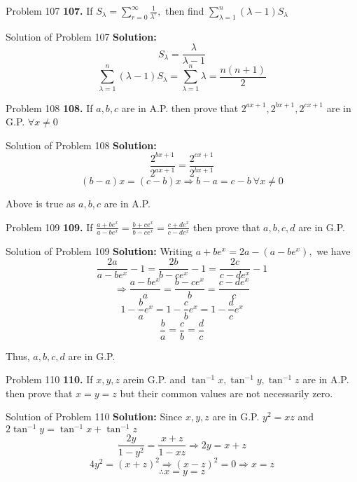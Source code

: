 \documentclass[aspectratio=1610,8pt]{beamer}
\begin{document}
\begin{frame}{Problem 107}
  \textbf{107.} If $S_\lambda = \sum_{r=0}^\infty \frac{1}{\lambda^r},$ then find $\sum_{\lambda = 1}^n(\lambda - 1)S_\lambda$
\end{frame}
\begin{frame}{Solution of Problem 107}
  \textbf{Solution:} $$S_\lambda = \frac{\lambda}{\lambda - 1}$$
  $$\sum_{\lambda = 1}^n(\lambda - 1)S_\lambda = \sum_{\lambda = 1}^n\lambda = \frac{n(n + 1)}{2}$$
\end{frame}
\begin{frame}{Problem 108}
  \textbf{108.} If $a, b, c$ are in A.P. then prove that $2^{ax + 1}, 2^{bx + 1}, 2^{cx + 1}$ are in G.P. $\forall x\neq 0$
\end{frame}
\begin{frame}{Solution of Problem 108}
  \textbf{Solution:} $$\frac{2^{bx + 1}}{2^{ax + 1}} = \frac{2^{cx + 1}}{2^{bx + 1}}$$
  $$(b - a)x = (c - b)x \Rightarrow b -a = c - b~\forall x \neq 0$$

  Above is true as $a, b, c$ are in A.P.
\end{frame}
\begin{frame}{Problem 109}
  \textbf{109.} If $\frac{a + be^x}{a - be^x} = \frac{b + ce^x}{b - ce^x} = \frac{c + de^x}{c - de^x}$ then prove that $a, b, c, d$
  are in G.P.
\end{frame}
\begin{frame}{Solution of Problem 109}
  \textbf{Solution:} Writing $a + be^x = 2a - (a - be^x),$ we have
  $$\frac{2a}{a - be^x} - 1 = \frac{2b}{b - ce^x} - 1 = \frac{2c}{c - de^x} - 1$$
  $$\Rightarrow \frac{a - be^x}{a} = \frac{b - ce^x}{b} = \frac{c - de^x}{c}$$
  $$1 - \frac{b}{a}e^x = 1 - \frac{c}{b}e^x = 1 - \frac{d}{c}e^x$$
  $$\frac{b}{a} = \frac{c}{b} = \frac{d}{c}$$

  Thus, $a, b, c, d$ are in G.P.
\end{frame}
\begin{frame}{Problem 110}
  \textbf{110.} If $x, y, z$ arein G.P. and $\tan^{-1}x, \tan^{-1}y, \tan^{-1}z$ are in A.P. then prove that $x = y = z$ but their
  common values are not necessarily zero.
\end{frame}
\begin{frame}{Solution of Problem 110}
  \textbf{Solution:} Since $x, y, z$ are in G.P. $y^2 = xz$ and $2\tan^{-1}y = \tan^{-1}x + \tan^{-1}z$
  $$\frac{2y}{1 - y^2} = \frac{x + z}{1 - xz}\Rightarrow 2y = x + z$$
  $$4y^2 = (x + z)^2 \Rightarrow (x - z)^2 = 0 \Rightarrow x = z$$
  $$\therefore x = y = z$$
\end{frame}
\end{document}
